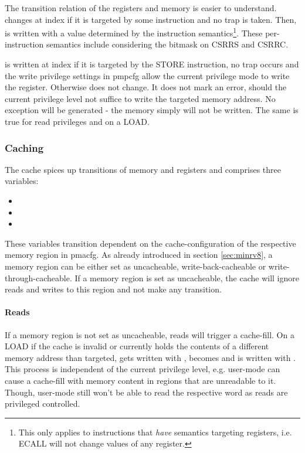 The transition relation of the registers and memory is easier to understand.
 changes at index  if it is targeted by some instruction and no trap is taken.
Then,  is written with a value determined by the instruction semantics\footnote{%
    This only applies to instructions that \textit{have} semantics targeting registers, i.e. ECALL will not change values of any register.
}.
These per-instruction semantics include considering the  bitmask on CSRRS and CSRRC.

 is written at index  if it is targeted by the STORE instruction, no trap occurs and the write privilege settings in \gls{pmpcfg} allow the current privilege mode to write the register.
Otherwise  does not change.
It does not mark an error, should the current privilege level not suffice to write the targeted memory address.
No exception will be generated - the memory simply will not be written.
The same is true for read privileges and  on a LOAD.

\subsubsection{Caching}

The cache spices up transitions of memory and registers and comprises three variables:
\begin{itemize}
    \item {}
    \item {}
    \item {}
\end{itemize}

These variables transition dependent on the cache-configuration of the respective memory region in \gls{pmacfg}.
As already introduced in section \ref{sec:minrv8}, a memory region can be either set as uncacheable, write-back-cacheable or write-through-cacheable.
If a memory region is set as uncacheable, the cache will ignore reads and writes to this region and not make any transition.

\paragraph{Reads}
If a memory region is not set as uncacheable, reads will trigger a cache-fill.
On a LOAD if the cache is invalid or currently holds the contents of a different memory address than targeted,  gets written with ,  becomes  and  is written with .
This process is independent of the current privilege level, e.g. user-mode can cause a cache-fill with memory content in regions that are unreadable to it.
Though, user-mode still won't be able to read the respective word as reads are privileged controlled.

